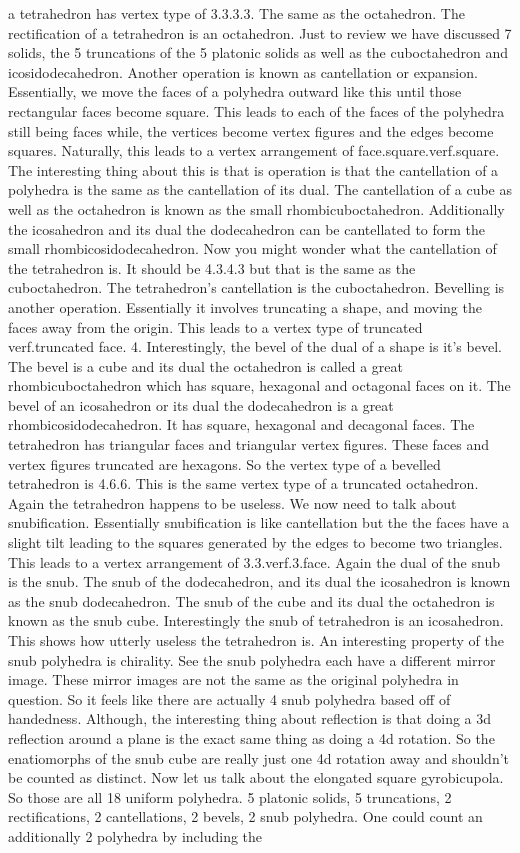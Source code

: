 \documentclass{article}
\begin{document}
a tetrahedron has vertex type of 3.3.3.3. The same as the octahedron. The rectification of a tetrahedron is an octahedron. Just to review we have discussed 7 solids, the 5 truncations of the 5 platonic solids as well as the cuboctahedron and icosidodecahedron. Another operation is known as cantellation or expansion. Essentially, we move the faces of a polyhedra outward like this until those rectangular faces become square. This leads to each of the faces of the polyhedra still being faces while, the vertices become vertex figures and the edges become squares. Naturally, this leads to a vertex arrangement of face.square.verf.square. The interesting thing about this is that is operation is that the cantellation of a polyhedra is the same as the cantellation of its dual. The cantellation of a cube as well as the octahedron is known as the small rhombicuboctahedron. Additionally the icosahedron and its dual the dodecahedron can be cantellated to form the small rhombicosidodecahedron. Now you might wonder what the cantellation of the tetrahedron is. It should be 4.3.4.3 but that is the same as the cuboctahedron. The tetrahedron's cantellation is the cuboctahedron. Bevelling is another operation. Essentially it involves truncating a shape, and moving the faces away from the origin. This leads to a vertex type of truncated verf.truncated face. 4. Interestingly, the bevel of the dual of a shape is it's bevel. The bevel is a cube and its dual the octahedron is called a great rhombicuboctahedron which has square, hexagonal and octagonal faces on it. The bevel of an icosahedron or its dual the dodecahedron is a great rhombicosidodecahedron. It has square, hexagonal and decagonal faces. The tetrahedron has triangular faces and triangular vertex figures. These faces and vertex figures truncated are hexagons. So the vertex type of a bevelled tetrahedron is 4.6.6. This is the same vertex type of a truncated octahedron. Again the tetrahedron happens to be useless. We now need to talk about snubification. Essentially snubification is like cantellation but the the faces have a slight tilt leading to the squares generated by the edges to become two triangles. This leads to a vertex arrangement of 3.3.verf.3.face. Again the dual of the snub is the snub. The snub of the dodecahedron, and its dual the icosahedron is known as the snub dodecahedron. The snub of the cube and its dual the octahedron is known as the snub cube. Interestingly the snub of tetrahedron is an icosahedron. This shows how utterly useless the tetrahedron is. An interesting property of the snub polyhedra is chirality. See the snub polyhedra each have a different mirror image. These mirror images are not the same as the original polyhedra in question. So it feels like there are actually 4 snub polyhedra based off of handedness. Although, the interesting thing about reflection is that doing a 3d reflection around a plane is the exact same thing as doing a 4d rotation.  So the enatiomorphs of the snub cube are really just one 4d rotation away and shouldn't be counted as distinct. Now let us talk about the elongated square gyrobicupola. So those are all 18 uniform polyhedra. 5 platonic solids, 5 truncations, 2 rectifications, 2 cantellations, 2 bevels, 2 snub polyhedra. One could count an additionally 2 polyhedra by including the 
\end{document}
